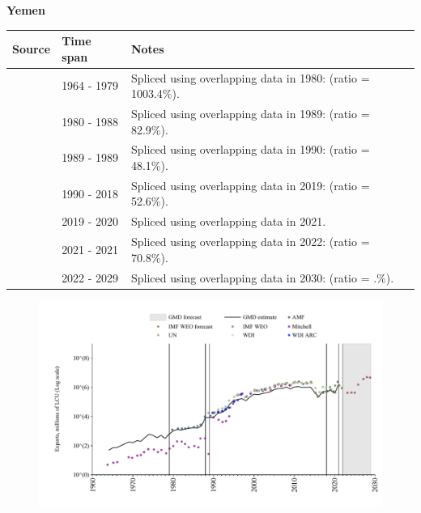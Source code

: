 \documentclass[12pt,a4paper,landscape]{article}
\begin{document}
\begin{adjustbox}{max totalsize={\paperwidth}{\paperheight},center}
\begin{minipage}[t][\textheight][t]{\textwidth}
\vspace*{0.5cm}
{}
\begin{center}
{\Large\bfseries Yemen}
\end{center}
\vspace{0.5cm}
\begin{table}[H]
\centering
\small
\begin{tabular}{|l|l|l|}
\hline
\textbf{Source} & \textbf{Time span} & \textbf{Notes} \\
\hline
\rowcolor{white}\cite{Mitchell}& 1964 - 1979 &Spliced using overlapping data in 1980: (ratio = 1003.4\%).\\
\rowcolor{lightgray}\cite{AMF}& 1980 - 1988 &Spliced using overlapping data in 1989: (ratio = 82.9\%).\\
\rowcolor{white}\cite{UN}& 1989 - 1989 &Spliced using overlapping data in 1990: (ratio = 48.1\%).\\
\rowcolor{lightgray}\cite{WDI}& 1990 - 2018 &Spliced using overlapping data in 2019: (ratio = 52.6\%).\\
\rowcolor{white}\cite{UN}& 2019 - 2020 &Spliced using overlapping data in 2021.\\
\rowcolor{lightgray}\cite{AMF}& 2021 - 2021 &Spliced using overlapping data in 2022: (ratio = 70.8\%).\\
\rowcolor{white}\cite{IMF_WEO_forecast}& 2022 - 2029 &Spliced using overlapping data in 2030: (ratio = .\%).\\
\hline
\end{tabular}
\end{table}
\begin{figure}[H]
\centering
\includegraphics[width=\textwidth,height=0.6\textheight,keepaspectratio]{graphs/YEM_exports.pdf}
\end{figure}
\end{minipage}
\end{adjustbox}
\end{document}
